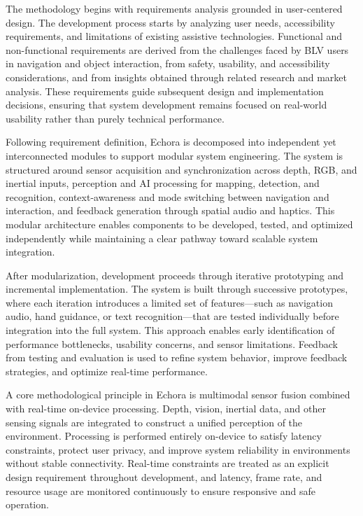 The methodology begins with requirements analysis grounded in user-centered design. The development process starts by analyzing user needs, accessibility requirements, and limitations of existing assistive technologies. Functional and non-functional requirements are derived from the challenges faced by BLV users in navigation and object interaction, from safety, usability, and accessibility considerations, and from insights obtained through related research and market analysis. These requirements guide subsequent design and implementation decisions, ensuring that system development remains focused on real-world usability rather than purely technical performance.

Following requirement definition, Echora is decomposed into independent yet interconnected modules to support modular system engineering. The system is structured around sensor acquisition and synchronization across depth, RGB, and inertial inputs, perception and AI processing for mapping, detection, and recognition, context-awareness and mode switching between navigation and interaction, and feedback generation through spatial audio and haptics. This modular architecture enables components to be developed, tested, and optimized independently while maintaining a clear pathway toward scalable system integration.

After modularization, development proceeds through iterative prototyping and incremental implementation. The system is built through successive prototypes, where each iteration introduces a limited set of features---such as navigation audio, hand guidance, or text recognition---that are tested individually before integration into the full system. This approach enables early identification of performance bottlenecks, usability concerns, and sensor limitations. Feedback from testing and evaluation is used to refine system behavior, improve feedback strategies, and optimize real-time performance.

A core methodological principle in Echora is multimodal sensor fusion combined with real-time on-device processing. Depth, vision, inertial data, and other sensing signals are integrated to construct a unified perception of the environment. Processing is performed entirely on-device to satisfy latency constraints, protect user privacy, and improve system reliability in environments without stable connectivity. Real-time constraints are treated as an explicit design requirement throughout development, and latency, frame rate, and resource usage are monitored continuously to ensure responsive and safe operation.

